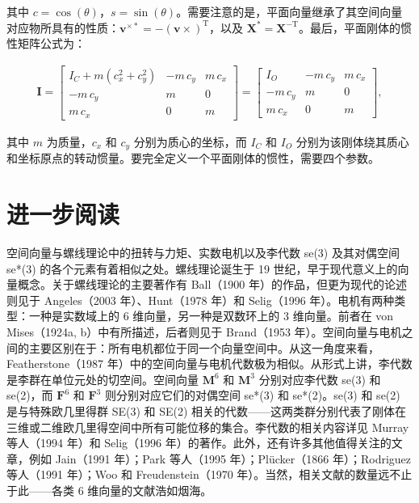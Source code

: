 \documentclass[10pt,a4paper]{book}
\theoremstyle{thmstyle} %
\theoremstyle{defstyle} %
\theoremstyle{prostyle} %
\begin{document}
其中 $c=\cos(\theta)$，$s=\sin(\theta)$。需要注意的是，平面向量继承了其空间向量对应物所具有的性质：$\boldsymbol{v}^{\times*}=-(\boldsymbol{v}\times)^{\mathrm{T}}$，以及 $\boldsymbol{X}^{*}=\boldsymbol{X}^{-\mathrm{T}}$。最后，平面刚体的惯性矩阵公式为：



$$
\begin{array}{r} { \boldsymbol{ I } = \left[ \begin{array}{lll} { I _ { C } + m \left( c _ { x } ^{2} + c _ { y } ^{2} \right) } & { - m \, c _ { y } } & { m \, c _ { x } } \\{ - m \, c _ { y } } & { m } & { 0 } \\{ m \, c _ { x } } & { 0 } & { m } \end{array} \right] = \left[ \begin{array}{lll} { I _ { O } } & { - m \, c _ { y } } & { m \, c _ { x } } \\{ - m \, c _ { y } } & { m } & { 0 } \\{ m \, c _ { x } } & { 0 } & { m } \end{array} \right] , } \end{array}
$$



其中 $m$ 为质量，$c_{x}$ 和 $c_{y}$ 分别为质心的坐标，而 $I_{C}$ 和 $I_{O}$ 分别为该刚体绕其质心和坐标原点的转动惯量。要完全定义一个平面刚体的惯性，需要四个参数。



\section{进一步阅读}





空间向量与螺线理论中的扭转与力矩、实数电机以及李代数 se(3) 及其对偶空间 se*(3) 的各个元素有着相似之处。螺线理论诞生于 19 世纪，早于现代意义上的向量概念。关于螺线理论的主要著作有 Ball（1900 年）的作品，但更为现代的论述则见于 Angeles（2003 年）、Hunt（1978 年）和 Selig（1996 年）。电机有两种类型：一种是实数域上的 6 维向量，另一种是双数环上的 3 维向量。前者在 von Mises（1924a, b）中有所描述，后者则见于 Brand（1953 年）。空间向量与电机之间的主要区别在于：所有电机都位于同一个向量空间中。从这一角度来看，Featherstone（1987 年）中的空间向量与电机代数极为相似。从形式上讲，李代数是李群在单位元处的切空间。空间向量 $\mathbf{M}^{6}$ 和 $\mathbf{M}^{3}$ 分别对应李代数 se(3) 和 se(2)，而 $\mathbf{F}^{6}$ 和 $\mathbf{F}^{3}$ 则分别对应它们的对偶空间 se*(3) 和 se*(2)。se(3) 和 se(2) 是与特殊欧几里得群 SE(3) 和 SE(2) 相关的代数——这两类群分别代表了刚体在三维或二维欧几里得空间中所有可能位移的集合。李代数的相关内容详见 Murray 等人（1994 年）和 Selig（1996 年）的著作。此外，还有许多其他值得关注的文章，例如 Jain（1991 年）；Park 等人（1995 年）；Plücker（1866 年）；Rodriguez 等人（1991 年）；Woo 和 Freudenstein（1970 年）。当然，相关文献的数量远不止于此——各类 6 维向量的文献浩如烟海。
\end{document}
